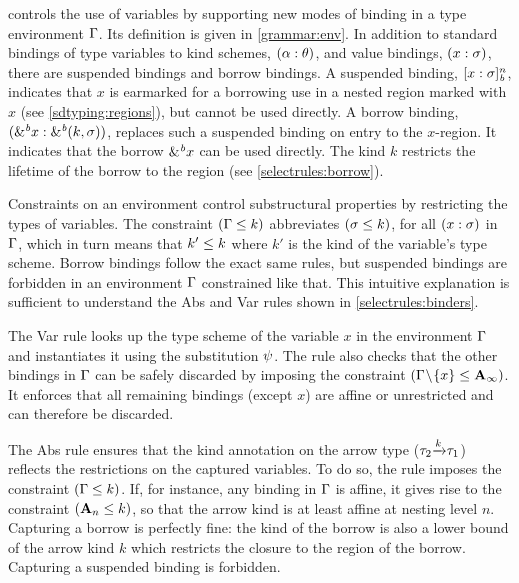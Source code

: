 \lang controls the use of variables by supporting new modes of
binding in a type environment $\Gamma$.
Its definition is given in  \cref{grammar:env}.
In addition to standard bindings of type variables to kind schemes,
$(\alpha : \theta)$,  and value bindings, $(x : \sigma)$, there
are suspended bindings and borrow bindings.
A suspended binding, $[x : \sigma]_{\textit{b}}^n$, indicates that $x$ is
earmarked for a borrowing use in a nested region
marked with $x$ (see \cref{sdtyping:regions}), but
cannot be used directly.
A borrow binding, $({\&}^{\textit{b}}x : {\&}^{\textit{b}}(k,\sigma))$, replaces
such a suspended binding on entry to the $x$-region. It indicates 
that the borrow ${\&}^{\textit{b}}x$ can be used directly. The kind $k$
restricts the lifetime of the borrow to the region (see \cref{selectrules:borrow}).


Constraints on an environment control substructural properties by
restricting the types of variables.  The constraint $(\Gamma \leq k)$
abbreviates $(\sigma \leq k)$, for all $(x : \sigma)$
in $\Gamma$, which in turn means that $k' \leq k$ where $k'$ is the kind of
the variable's type scheme.
Borrow bindings follow the exact same rules, but suspended bindings
are forbidden in an environment $\Gamma$ constrained like that.
This intuitive explanation is sufficient to understand
the {\sc Abs} and {\sc Var} rules shown in
\cref{selectrules:binders}. 

The {\sc Var} rule looks up the type scheme of the variable $x$ in
the environment $\Gamma$
and instantiates it using the substitution $\mathrm{\psi}$. The rule also
checks that the other bindings in $\Gamma$ can be safely discarded by
imposing the constraint $(\Gamma\!\setminus\!\{x\} \leq \mathbf{A}_\infty)$. 
It enforces that all remaining bindings (except $x$) are affine or
unrestricted and can therefore be discarded.

The {\sc Abs} rule ensures that the kind annotation on the arrow type
($\tau_2 {\xrightarrow{k}} \tau_1$) reflects the restrictions on the captured variables.
To do so, the rule imposes the constraint $(\Gamma \leq k)$.
If, for instance, any binding in $\Gamma$ is affine, it gives rise to the
constraint $(\mathbf{A}_n \leq k)$, so that  the arrow kind is at least
affine at nesting level $n$.
Capturing a borrow is perfectly fine: the kind of the borrow is also a
lower bound of the arrow kind $k$ which restricts the closure
to the region of the borrow.
Capturing a suspended binding is forbidden.




